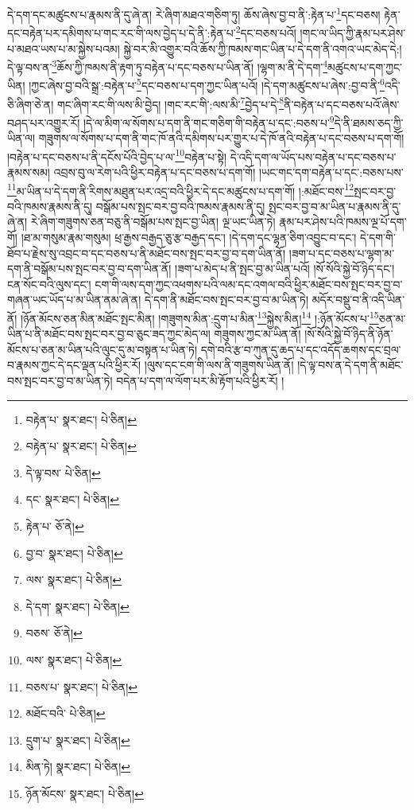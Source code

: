 དེ་དག་དང་མཚུངས་པ་རྣམས་ནི་དུ་ཞེ་ན། རེ་ཞིག་མཐའ་གཅིག་ཏུ། ཆོས་ཞེས་བྱ་བ་ནི་:རྟེན་པ་\footnote{བརྟེན་པ་  སྣར་ཐང་།  པེ་ཅིན། }དང་བཅས། རྟེན་དང་བརྟེན་པར་དམིགས་པ་གང་རང་གི་ལས་བྱེད་པ་དེ་ནི་:རྟེན་པ་\footnote{བརྟེན་པ་  སྣར་ཐང་།  པེ་ཅིན། }དང་བཅས་པའོ། །གང་ལ་ཡིད་ཀྱི་རྣམ་པར་ཤེས་པ་མཐའ་ཡས་པ་མ་སྐྱེས་པའམ། སྐྱེ་བར་མི་འགྱུར་བའི་ཆོས་ཀྱི་ཁམས་གང་ཡིན་པ་དེ་དག་ནི་འགའ་ཡང་མེད་དེ:། དེ་ལྟ་བས་ན་\footnote{དེ་ལྟ་བས་  པེ་ཅིན། }ཆོས་ཀྱི་ཁམས་ནི་རྟག་ཏུ་བརྟེན་པ་དང་བཅས་པ་ཡིན་ནོ། །ལྷག་མ་ནི་དེ་དག་\footnote{དང་  སྣར་ཐང་།  པེ་ཅིན། }མཚུངས་པ་དག་ཀྱང་ཡིན། །ཀྱང་ཞེས་བྱ་བའི་སྒྲ་:བརྟེན་པ་\footnote{རྟེན་པ་  ཅོ་ནེ། }དང་བཅས་པ་དག་ཀྱང་ཡིན་པའོ། །དེ་དག་མཚུངས་པ་ཞེས་:བྱ་བ་ནི་\footnote{བྱ་བ་  སྣར་ཐང་།  པེ་ཅིན། }འདི་ཅི་ཞིག་ཅེ་ན། གང་ཞིག་རང་གི་ལས་མི་བྱེད། །གང་རང་གི་:ལས་མི་\footnote{ལས་  སྣར་ཐང་།  པེ་ཅིན། }བྱེད་པ་དེ་\footnote{དེ་དག་  སྣར་ཐང་།  པེ་ཅིན། }ནི་བརྟེན་པ་དང་བཅས་པའོ་ཞེས་བཤད་པར་འགྱུར་རོ། །དེ་ལ་མིག་ལ་སོགས་པ་དག་ནི་གང་གཅིག་གི་བརྟེན་པ་དང་:བཅས་པ་\footnote{བཅས་  ཅོ་ནེ། }དེ་ནི་ཐམས་ཅད་ཀྱི་ཡིན་ལ། གཟུགས་ལ་སོགས་པ་དག་ནི་གང་ཁོ་ནའི་དམིགས་པར་གྱུར་པ་དེ་ཁོ་ནའི་བརྟེན་པ་དང་བཅས་པ་དག་གོ། །བརྟེན་པ་དང་བཅས་པ་ནི་དངོས་པོའི་བྱེད་པ་ལ་\footnote{ལས་  སྣར་ཐང་།  པེ་ཅིན། }བརྟེན་པ་སྟེ། དེ་འདི་དག་ལ་ཡོད་པས་བརྟེན་པ་དང་བཅས་པ་རྣམས་སམ། འབྲས་བུ་ལ་རེག་པའི་ཕྱིར་བརྟེན་པ་དང་བཅས་པ་དག་གོ། །ཡང་གང་དག་བརྟེན་པ་དང་:བཅས་པས་\footnote{བཅས་པ་  སྣར་ཐང་།  པེ་ཅིན། }མ་ཡིན་པ་དེ་དག་ནི་རིགས་མཐུན་པར་འདྲ་བའི་ཕྱིར་དེ་དང་མཚུངས་པ་དག་གོ། །:མཐོང་བས་\footnote{མཐོང་བའི་  པེ་ཅིན། }སྤང་བར་བྱ་བའི་ཁམས་རྣམས་ནི་དུ། བསྒོམ་པས་སྤང་བར་བྱ་བའི་ཁམས་རྣམས་ནི་དུ། སྤང་བར་བྱ་བ་མ་ཡིན་པ་རྣམས་ནི་དུ་ཞེ་ན། རེ་ཞིག་གཟུགས་ཅན་བཅུ་ནི་བསྒོམ་པས་སྤང་བྱ་ཡིན། ལྔ་ཡང་ཡིན་ཏེ། རྣམ་པར་ཤེས་པའི་ཁམས་ལྔ་པོ་དག་གོ། །ཐ་མ་གསུམ་རྣམ་གསུམ། ཕྲ་རྒྱས་བརྒྱད་ཅུ་རྩ་བརྒྱད་དང་། །དེ་དག་དང་ལྷན་ཅིག་འབྱུང་བ་དང་། དེ་དག་གི་ཐོབ་པ་རྗེས་སུ་འབྲང་བ་དང་བཅས་པ་ནི་མཐོང་བས་སྤང་བར་བྱ་བ་དག་ཡིན་ནོ། །ཟག་པ་དང་བཅས་པ་ལྷག་མ་དག་ནི་བསྒོམ་པས་སྤང་བར་བྱ་བ་དག་ཡིན་ནོ། །ཟག་པ་མེད་པ་ནི་སྤང་བྱ་མ་ཡིན་པའོ། །སོ་སོའི་སྐྱེ་བོ་ཉིད་དང་། ངན་སོང་བའི་ལུས་དང་། ངག་གི་ལས་དག་ཀྱང་འཕགས་པའི་ལམ་དང་འགལ་བའི་ཕྱིར་མཐོང་བས་སྤང་བར་བྱ་བ་གཞན་ཡང་ཡོད་པ་མ་ཡིན་ནམ་ཞེ་ན། དེ་དག་ནི་མཐོང་བས་སྤང་བར་བྱ་བ་མ་ཡིན་ཏེ། མདོར་བསྡུ་བ་ནི་འདི་ཡིན་ནོ། །ཉོན་མོངས་ཅན་མིན་མཐོང་སྤང་མིན། །གཟུགས་མིན་:དྲུག་པ་མིན་\footnote{དྲུག་པ་  སྣར་ཐང་།  པེ་ཅིན། }སྐྱེས་མིན།\footnote{མིན་ཏེ།  སྣར་ཐང་།  པེ་ཅིན། } །:ཉོན་མོངས་པ་\footnote{ཉོན་མོངས་  སྣར་ཐང་།  པེ་ཅིན། }ཅན་མ་ཡིན་པ་ནི་མཐོང་བས་སྤང་བར་བྱ་བ་ཅུང་ཟད་ཀྱང་མེད་ལ། གཟུགས་ཀྱང་མ་ཡིན་ནོ། །སོ་སོའི་སྐྱེ་བོ་ཉིད་ནི་ཉོན་མོངས་པ་ཅན་མ་ཡིན་པའི་ལུང་དུ་མ་བསྟན་པ་ཡིན་ཏེ། དགེ་བའི་རྩ་བ་ཀུན་དུ་ཆད་པ་དང་འདོད་ཆགས་དང་བྲལ་བ་རྣམས་ཀྱང་དེ་དང་ལྡན་པའི་ཕྱིར་རོ། །ལུས་དང་ངག་གི་ལས་ནི་གཟུགས་ཡིན་ནོ། །དེ་ལྟ་བས་ན་དེ་དག་ནི་མཐོང་བས་སྤང་བར་བྱ་བ་མ་ཡིན་ཏེ། བདེན་པ་དག་ལ་ལོག་པར་མི་རྟོག་པའི་ཕྱིར་རོ། །
